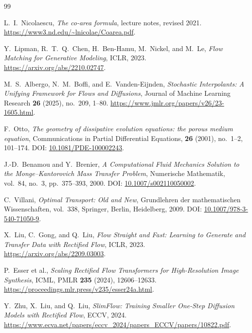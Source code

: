 \documentclass[11pt,reqno,a4paper]{amsart}
\theoremstyle{plain}
\theoremstyle{definition}
\theoremstyle{remark}
\begin{document}
\begin{thebibliography}{99}

L.~I.~Nicolaescu,
\emph{The co-area formula}, lecture notes, revised 2021.
\url{https://www3.nd.edu/~lnicolae/Coarea.pdf}.

Y.~Lipman, R.~T.~Q.~Chen, H.~Ben-Hamu, M.~Nickel, and M.~Le,
\emph{Flow Matching for Generative Modeling}, ICLR, 2023.
\url{https://arxiv.org/abs/2210.02747}.

M.~S.~Albergo, N.~M.~Boffi, and E.~Vanden-Eijnden,
\emph{Stochastic Interpolants: A Unifying Framework for Flows and Diffusions},
Journal of Machine Learning Research \textbf{26} (2025), no.~209, 1--80.
\url{https://www.jmlr.org/papers/v26/23-1605.html}.

F.~Otto,
\textit{The geometry of dissipative evolution equations: the porous medium equation},
Communications in Partial Differential Equations,
\textbf{26} (2001), no.~1--2, 101--174.
\newblock DOI: \href{https://doi.org/10.1081/PDE-100002243}
{10.1081/PDE-100002243}.

J.-D.\ Benamou and Y.\ Brenier,
\textit{A Computational Fluid Mechanics Solution to the Monge--Kantorovich Mass Transfer Problem},
Numerische Mathematik, vol.\ 84, no.\ 3, pp.\ 375--393, 2000.
\newblock DOI: \href{https://doi.org/10.1007/s002110050002}
{10.1007/s002110050002}.

C.~Villani,
\textit{Optimal Transport: Old and New},
Grundlehren der mathematischen Wissenschaften, vol.~338,
Springer, Berlin, Heidelberg, 2009.
\newblock DOI: \href{https://doi.org/10.1007/978-3-540-71050-9}
{10.1007/978-3-540-71050-9}.

X.~Liu, C.~Gong, and Q.~Liu,
\emph{Flow Straight and Fast: Learning to Generate and Transfer Data with Rectified Flow},
ICLR, 2023. \url{https://arxiv.org/abs/2209.03003}.

P.~Esser et al.,
\emph{Scaling Rectified Flow Transformers for High-Resolution Image Synthesis},
ICML, PMLR \textbf{235} (2024), 12606--12633.
\url{https://proceedings.mlr.press/v235/esser24a.html}.

Y.~Zhu, X.~Liu, and Q.~Liu,
\emph{SlimFlow: Training Smaller One-Step Diffusion Models with Rectified Flow},
ECCV, 2024.
\url{https://www.ecva.net/papers/eccv_2024/papers_ECCV/papers/10822.pdf}.


\end{thebibliography}
\end{document}
